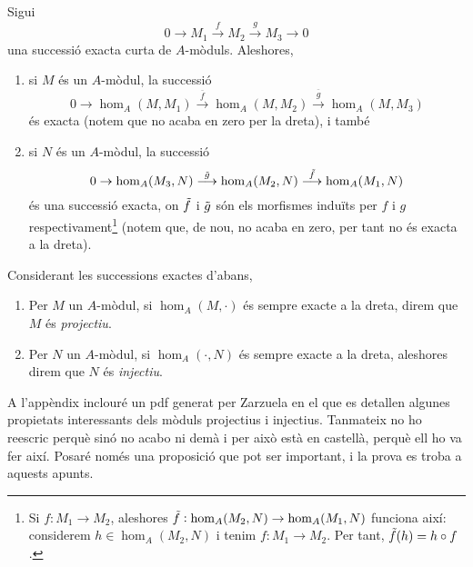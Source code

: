\documentclass[../../../main.tex]{subfiles}
\begin{document}
\begin{prop}
\label{prop:successioHomEsquerra} Sigui
\begin{equation}
    \label{eq:successioExacta1}
    0\to M_1\overset{f}{\to}M_2\overset{g}{\to}M_3\to 0
\end{equation}
una successió exacta curta de $A$-mòduls. Aleshores,
\begin{enumerate}
    \item si $M$ és un $A$-mòdul, la successió
    \begin{equation}
        \label{eq:successioExactaHomEsquerra}
        0\to \hom_A(M,M_1)\overset{\overline{f}}{\longrightarrow}\hom_A(M,M_2)\overset{\overline{g}}{\longrightarrow}\hom_A(M,M_3)
    \end{equation}
    és exacta (notem que no acaba en zero per la dreta), i també
    \item si $N$ és un $A$-mòdul, la successió
    \begin{equation}
        \notag
        0\to \hom_A(M_3,N)\overset{\Tilde{g}}{\longrightarrow}\hom_A(M_2,N)\overset{\Tilde{f}}{\longrightarrow}\hom_A(M_1,N)  
    \end{equation}
    és una successió exacta, on $\Tilde{f}$ i $\Tilde{g}$ són els morfismes induïts per $f$ i $g$ respectivament\footnote{Si $f:M_1\to M_2$, aleshores $\Tilde{f}:\hom_A(M_2,N)\to \hom_A(M_1,N)$ funciona així: considerem $h\in \hom_A(M_2,N)$ i tenim $f:M_1\to M_2$. Per tant, $\Tilde{f}(h) = h\circ f$.} (notem que, de nou, no acaba en zero, per tant no és exacta a la dreta).
\end{enumerate}
\end{prop}

\begin{defi}
\label{def:projectiu}\label{def:injectiu} Considerant les successions exactes d'abans,
\begin{enumerate}[(1)]
    \item Per $M$ un $A$-mòdul, si $\hom_A(M,\cdotp)$ és sempre exacte a la dreta, direm que $M$ és \textit{projectiu}.
    \item Per $N$ un $A$-mòdul, si $\hom_A(\cdotp,N)$ és sempre exacte a la dreta, aleshores direm que $N$ és \textit{injectiu}.
\end{enumerate}
\end{defi}

A l'appèndix inclouré un pdf generat per Zarzuela en el que es detallen algunes propietats interessants dels mòduls projectius i injectius. Tanmateix no ho reescric perquè sinó no acabo ni demà i per això està en castellà, perquè ell ho va fer així. Posaré només una proposició que pot ser important, i la prova es troba a aquests apunts.
\end{document}
